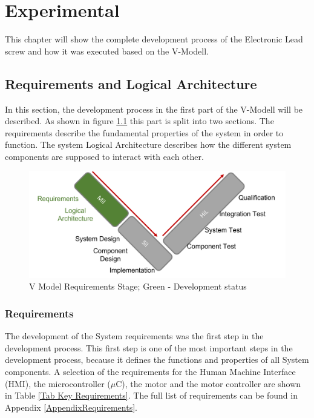 \chapter{Experimental}
\label{experimental}
This chapter will show the complete development process of the Electronic Lead screw and how it was executed based on the V-Modell.
 
\section{Requirements and Logical Architecture}
 
In this section, the development process in the first part of the V-Modell will be described. As shown in figure \ref{V Model Requirements} this part is split into two sections. The requirements describe the fundamental properties of the system in order to function. The system Logical Architecture describes how the different system components are supposed to interact with each other.
 
\begin{figure}
    \begin{center}
    \includegraphics[width=12cm]{Pictures/V Model Requirements.png}
    \caption[V Model Requirements]{V Model Requirements Stage; Green - Development status}
    \label{V Model Requirements}
    \end{center}
\end{figure}
 
 
\subsection{Requirements}
The development of the System requirements was the first step in the development process. This first step is one of the most important steps in the development process, because it defines the functions and properties of all System components. A selection of the requirements for the Human Machine Interface (HMI), the microcontroller ($\mu$C), the motor and the motor controller are shown in Table \ref{Tab Key Requirements}. The full list of requirements can be found in Appendix \ref{AppendixRequirements}.
 
